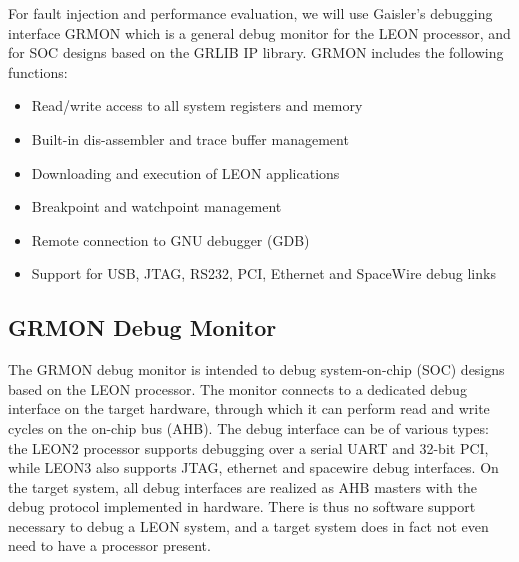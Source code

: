 
  
  For fault injection and performance evaluation, we will use Gaisler's debugging interface GRMON which is a general debug monitor for the LEON processor, and for SOC designs based on the GRLIB IP
library. GRMON includes the following functions:
\begin{itemize}

 \item Read/write access to all system registers and memory
 \item Built-in dis-assembler and trace buffer management
 \item Downloading and execution of LEON applications
 \item Breakpoint and watchpoint management
 \item Remote connection to GNU debugger (GDB)
 \item Support for USB, JTAG, RS232, PCI, Ethernet and SpaceWire debug links

\end{itemize}
 
\subsection{ GRMON Debug Monitor}

The GRMON debug monitor is intended to debug system-on-chip (SOC) designs based on the LEON processor. 
The monitor connects to a dedicated debug interface on the target hardware, through which it can perform
read and write cycles on the on-chip bus (AHB). The debug interface can be of various types: the LEON2 processor
supports debugging over a serial UART and 32-bit PCI, while LEON3 also supports JTAG, ethernet and
spacewire debug interfaces. On the target system, all debug
interfaces are realized as AHB masters with the debug protocol implemented in hardware. There is thus no
software support necessary to debug a LEON system, and a target system does in fact not even need to have a
processor present.

